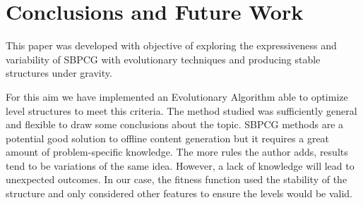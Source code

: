 \documentclass[sigconf]{acmart}
\begin{document}



%
\section{Conclusions and Future Work} 
\label{sec:conclusions}


This paper was developed with
objective of exploring the expressiveness and variability of 
SBPCG with evolutionary techniques
and producing stable structures under gravity.

For this aim we have implemented an Evolutionary Algorithm able to optimize 
level structures to meet this criteria. %
The method studied was
sufficiently general and flexible to draw some conclusions about the
topic. SBPCG methods are a potential good solution to offline content
generation but it requires a great amount of problem-specific
knowledge. 
The more rules the author adds, results tend to be 
variations of the same idea. However, %
a lack of knowledge
will lead to unexpected outcomes.
In our case, the fitness function used the 
stability of the structure and only considered other features %
to ensure the levels would be valid.
\end{document}
